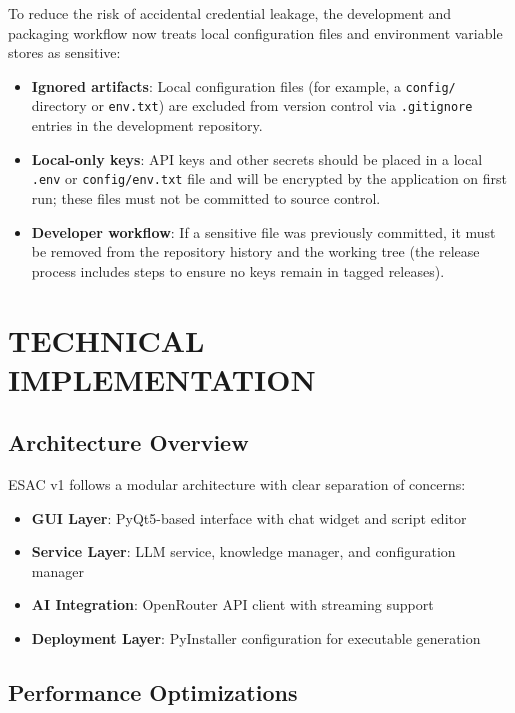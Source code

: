 \documentclass[tm]{ornltm} %
\begin{document}
To reduce the risk of accidental credential leakage, the development and packaging workflow now treats local configuration files and environment variable stores as sensitive:

\begin{itemize}
  \item \textbf{Ignored artifacts}: Local configuration files (for example, a \texttt{config/} directory or \texttt{env.txt}) are excluded from version control via \texttt{.gitignore} entries in the development repository.
  \item \textbf{Local-only keys}: API keys and other secrets should be placed in a local \texttt{.env} or \texttt{config/env.txt} file and will be encrypted by the application on first run; these files must not be committed to source control.
  \item \textbf{Developer workflow}: If a sensitive file was previously committed, it must be removed from the repository history and the working tree (the release process includes steps to ensure no keys remain in tagged releases).
\end{itemize}

\section{TECHNICAL IMPLEMENTATION}
\label{sec:technical}

\subsection{Architecture Overview}
\label{subsec:architecture}

ESAC v1 follows a modular architecture with clear separation of concerns:

\begin{itemize}
  \item \textbf{GUI Layer}: PyQt5-based interface with chat widget and script editor
  \item \textbf{Service Layer}: LLM service, knowledge manager, and configuration manager
  \item \textbf{AI Integration}: OpenRouter API client with streaming support
  \item \textbf{Deployment Layer}: PyInstaller configuration for executable generation
\end{itemize}

\subsection{Performance Optimizations}
\label{subsec:performance}
\end{document}
